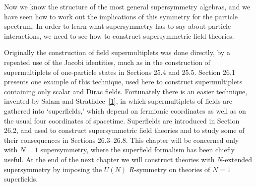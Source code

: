 
Now we know the structure of the most general supersymmetry algebras, and we
have seen how to work out the implications of this symmetry for the particle
spectrum. In order to learn what supersymmetry has to say about particle
interactions, we need to see how to construct supersymmetric field theories.

Originally the construction of field supermultiplets was done directly, by a
repeated use of the Jacobi identities, much as in the construction of
supermultiplets of one-particle states in Sections 25.4 and 25.5. Section 26.1
presents one example of this technique, used here to construct supermultiplets
containing only scalar and Dirac fields. Fortunately there is an easier
technique, invented by Salam and Strathdee~\hyperref[ch26-ref-1]{[1]}, in which
supermultiplets of fields are gathered into `superfields,' which depend on
fermionic coordinates as well as on the usual four coordinates of spacetime.
Superfields are introduced in Section 26.2, and used to construct
supersymmetric field theories and to study some of their consequences in
Sections 26.3--26.8. This chapter will be concerned only with \(N=1\)
supersymmetry, where the superfield formalism has been chiefly useful. At the
end of the next chapter we will construct theories with \(N\)-extended
supersymmetry by imposing the \(U(N)\) \(R\)-symmetry on theories of \(N=1\)
superfields.
